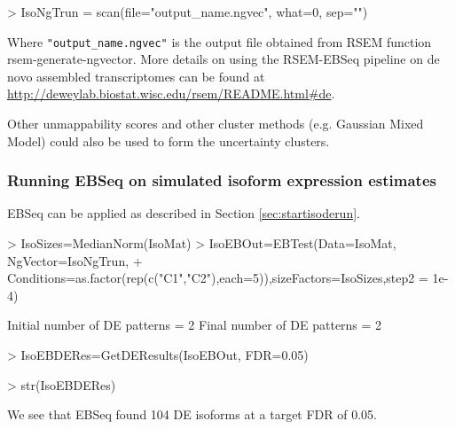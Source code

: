 \documentclass{article}
\begin{document}
\begin{Schunk}
\begin{Sinput}
> IsoNgTrun = scan(file="output_name.ngvec", what=0, sep="\n")
\end{Sinput}
\end{Schunk}
Where \verb+"output_name.ngvec"+ is the output file obtained from RSEM function rsem-generate-ngvector. 
More details on using the RSEM-EBSeq pipeline 
on de novo assembled transcriptomes can be found 
at \url{http://deweylab.biostat.wisc.edu/rsem/README.html#de}.

Other unmappability scores and other cluster methods (e.g. Gaussian Mixed Model) 
could also be used to form the uncertainty clusters.

\subsubsection{Running EBSeq on simulated isoform expression estimates}
\label{sec:detailedisoderun}
EBSeq can be applied as described in Section \ref{sec:startisoderun}.
\begin{Schunk}
\begin{Sinput}
> IsoSizes=MedianNorm(IsoMat)
> IsoEBOut=EBTest(Data=IsoMat, NgVector=IsoNgTrun, 
+ Conditions=as.factor(rep(c("C1","C2"),each=5)),sizeFactors=IsoSizes,step2 = 1e-4)
\end{Sinput}
\begin{Soutput}
Initial number of DE patterns = 2
Final number of DE patterns = 2
\end{Soutput}
\begin{Sinput}
> IsoEBDERes=GetDEResults(IsoEBOut, FDR=0.05)
\end{Sinput}
\end{Schunk}
\begin{Schunk}
\begin{Sinput}
> str(IsoEBDERes)
\end{Sinput}
\end{Schunk}
\noindent We see that EBSeq found 104 DE isoforms at a target FDR of 0.05. 
\end{document}
